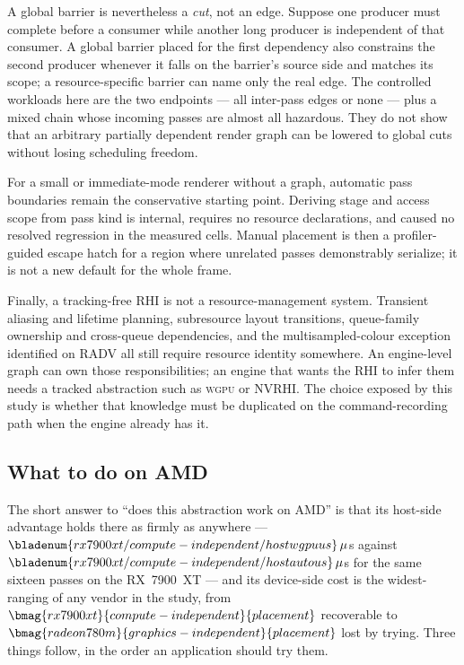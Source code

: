 \documentclass[10pt,twocolumn]{article}
\newcommand{\wgpu}{\textsc{wgpu}}
\begin{document}
A global barrier is nevertheless a \emph{cut}, not an edge. Suppose one
producer must complete before a consumer while another long producer is
independent of that consumer. A global barrier placed for the first dependency
also constrains the second producer whenever it falls on the barrier's source
side and matches its scope; a resource-specific barrier can name only the real
edge. The controlled workloads here are the two endpoints --- all inter-pass
edges or none --- plus a mixed chain whose incoming passes are almost all
hazardous. They do not show that an arbitrary partially dependent render graph
can be lowered to global cuts without losing scheduling freedom.

For a small or immediate-mode renderer without a graph, automatic pass
boundaries remain the conservative starting point. Deriving stage and access
scope from pass kind is internal, requires no resource declarations, and
caused no resolved regression in the measured cells. Manual placement is then
a profiler-guided escape hatch for a region where unrelated passes demonstrably
serialize; it is not a new default for the whole frame.

Finally, a tracking-free RHI is not a resource-management system. Transient
aliasing and lifetime planning, subresource layout transitions, queue-family
ownership and cross-queue dependencies, and the multisampled-colour exception
identified on RADV all still require resource identity somewhere. An
engine-level graph can own those responsibilities; an engine that wants the
RHI to infer them needs a tracked abstraction such as \wgpu{} or NVRHI. The
choice exposed by this study is whether that knowledge must be duplicated on
the command-recording path when the engine already has it.

\subsection{What to do on AMD}
\label{sec:amd-advice}

The short answer to ``does this abstraction work on AMD'' is that its host-side
advantage holds there as firmly as anywhere ---
$\bladenum{rx7900xt/compute-independent/hostwgpuus}\,\mu$s against
$\bladenum{rx7900xt/compute-independent/hostautous}\,\mu$s for the same sixteen
passes on the RX~7900~XT --- and its device-side cost is the widest-ranging of
any vendor in the study, from
$\bmag{rx7900xt}{compute-independent}{placement}$ recoverable to
$\bmag{radeon780m}{graphics-independent}{placement}$ lost by trying. Three
things follow, in the order an application should try them.
\end{document}
